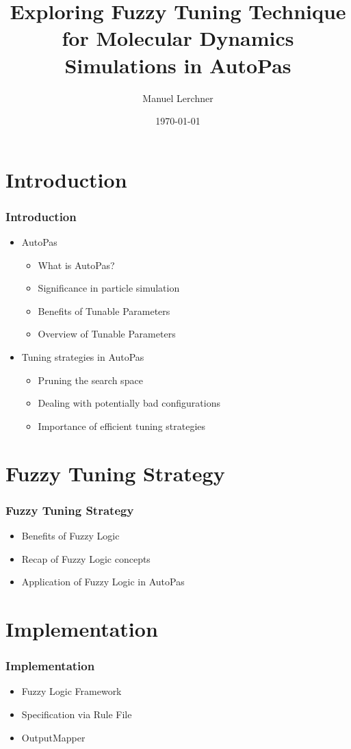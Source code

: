 \documentclass[
	10pt,
	t		%
]{beamer}
\title{Exploring Fuzzy Tuning Technique for Molecular Dynamics Simulations in AutoPas}
\author{Manuel Lerchner}
\date{\today}
\begin{document}
\maketitle

\section{Introduction}
\begin{frame}
	\frametitle{Introduction}
	\begin{itemize}
		\item AutoPas
		      \begin{itemize}
			      \item What is AutoPas?
			      \item Significance in particle simulation
			      \item Benefits of Tunable Parameters
			      \item Overview of Tunable Parameters
		      \end{itemize}
		\item Tuning strategies in AutoPas
		      \begin{itemize}
			      \item Pruning the search space
			      \item Dealing with potentially bad configurations
			      \item Importance of efficient tuning strategies
		      \end{itemize}
	\end{itemize}
\end{frame}

\section{Fuzzy Tuning Strategy}
\begin{frame}
	\frametitle{Fuzzy Tuning Strategy}
	\begin{itemize}
		\item Benefits of Fuzzy Logic
		\item Recap of Fuzzy Logic concepts
		\item Application of Fuzzy Logic in AutoPas
	\end{itemize}
\end{frame}

\section{Implementation}
\begin{frame}
	\frametitle{Implementation}
	\begin{itemize}
		\item Fuzzy Logic Framework
		\item Specification via Rule File
		\item OutputMapper
	\end{itemize}
\end{frame}
\end{document}
